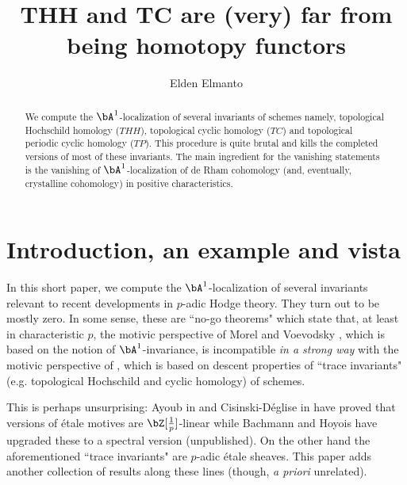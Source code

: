 \documentclass[a4paper,10pt]{amsart}
\title{}
\title{THH and TC are (very) far from being homotopy functors}
\author[E. Elmanto]{Elden Elmanto}
\begin{document}
\def\comp{\wedge}

\maketitle

\begin{abstract} We compute the $\bA^1$-localization of several invariants of schemes namely, topological Hochschild homology ($THH$), topological cyclic homology ($TC$) and topological periodic cyclic homology ($TP$). This procedure is quite brutal and kills the completed versions of most of these invariants. The main ingredient for the vanishing statements is the vanishing of $\bA^1$-localization of de Rham cohomology (and, eventually, crystalline cohomology) in positive characteristics.
\end{abstract}


\section{Introduction, an example and vista}

In this short paper, we compute the $\bA^1$-localization of several invariants relevant to recent developments in $p$-adic Hodge theory. They turn out to be mostly zero. In some sense, these are ``no-go theorems" which state that, at least in characteristic $p$, the motivic perspective of Morel and Voevodsky \cite{MV}, which is based on the notion of $\bA^1$-invariance, is incompatible \emph{in a strong way} with the motivic perspective of \cite{BMS2}, which is based on descent properties of ``trace invariants" (e.g. topological Hochschild and cyclic homology) of schemes.

This is perhaps unsurprising: Ayoub in \cite[Lemme 3.10]{AyoubEtale} and Cisinski-D\'eglise in \cite[Proposition A.3.1]{CDetale} have proved that versions of \'etale motives are $\bZ[\tfrac{1}{p}]$-linear while Bachmann and Hoyois have upgraded these to a spectral version (unpublished). On the other hand the aforementioned ``trace invariants" are $p$-adic \'etale sheaves. This paper adds another collection of results along these lines (though, \emph{a priori} unrelated).
\end{document}
